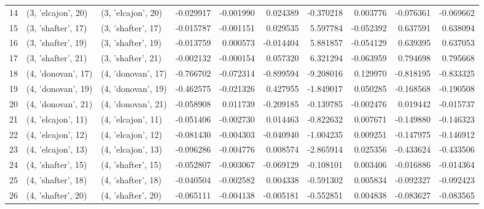 \begin{tabular}{lllrrrrrrr}
14 &  (3, 'elcajon', 20) &  (3, 'elcajon', 20) & -0.029917 &  -0.001990 &  0.024389 &  -0.370218 &  0.003776 &  -0.076361 & -0.069662 \\
15 &  (3, 'shafter', 17) &  (3, 'shafter', 17) & -0.015787 &  -0.001151 &  0.029535 &   5.597784 & -0.052392 &   0.637591 &  0.638094 \\
16 &  (3, 'shafter', 19) &  (3, 'shafter', 19) & -0.013759 &   0.000573 & -0.014404 &   5.881857 & -0.054129 &   0.639395 &  0.637053 \\
17 &  (3, 'shafter', 21) &  (3, 'shafter', 21) & -0.002132 &  -0.000154 &  0.057320 &   6.321294 & -0.063959 &   0.794698 &  0.795668 \\
18 &  (4, 'donovan', 17) &  (4, 'donovan', 17) & -0.766702 &  -0.072314 & -0.899594 &  -9.208016 &  0.129970 &  -0.818195 & -0.833325 \\
19 &  (4, 'donovan', 19) &  (4, 'donovan', 19) & -0.462575 &  -0.021326 &  0.427955 &  -1.849017 &  0.050285 &  -0.168568 & -0.190508 \\
20 &  (4, 'donovan', 21) &  (4, 'donovan', 21) & -0.058908 &   0.011739 & -0.209185 &  -0.139785 & -0.002476 &   0.019442 & -0.015737 \\
21 &  (4, 'elcajon', 11) &  (4, 'elcajon', 11) & -0.051406 &  -0.002730 &  0.014463 &  -0.822632 &  0.007671 &  -0.149880 & -0.146323 \\
22 &  (4, 'elcajon', 12) &  (4, 'elcajon', 12) & -0.081430 &  -0.004303 & -0.040940 &  -1.004235 &  0.009251 &  -0.147975 & -0.146912 \\
23 &  (4, 'elcajon', 13) &  (4, 'elcajon', 13) & -0.096286 &  -0.004776 &  0.008574 &  -2.865914 &  0.025356 &  -0.433624 & -0.433506 \\
24 &  (4, 'shafter', 15) &  (4, 'shafter', 15) & -0.052807 &  -0.003067 & -0.069129 &  -0.108101 &  0.003406 &  -0.016886 & -0.014364 \\
25 &  (4, 'shafter', 18) &  (4, 'shafter', 18) & -0.040504 &  -0.002582 &  0.004338 &  -0.591302 &  0.005834 &  -0.092327 & -0.092423 \\
26 &  (4, 'shafter', 20) &  (4, 'shafter', 20) & -0.065111 &  -0.004138 & -0.005181 &  -0.552851 &  0.004838 &  -0.083627 & -0.083565 \\
\bottomrule
\end{tabular}
